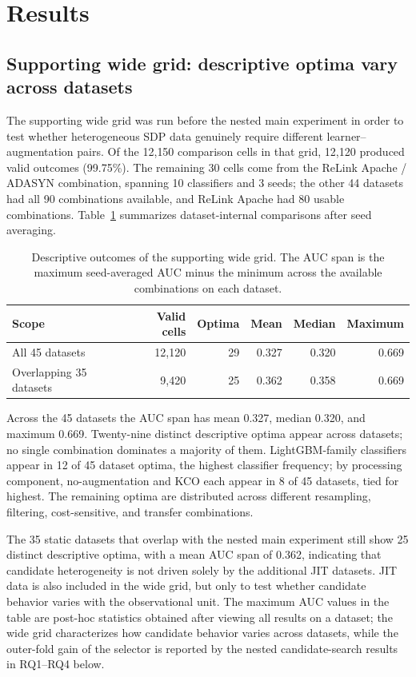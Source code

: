 \documentclass[referee]{USG}
\begin{document}
\section{Results}

\subsection{Supporting wide grid: descriptive optima vary across datasets}
The supporting wide grid was run before the nested main experiment in order to test whether heterogeneous SDP data genuinely require different learner--augmentation pairs. Of the 12{,}150 comparison cells in that grid, 12{,}120 produced valid outcomes (99.75\%). The remaining 30 cells come from the ReLink Apache / ADASYN combination, spanning 10 classifiers and 3 seeds; the other 44 datasets had all 90 combinations available, and ReLink Apache had 80 usable combinations. Table~\ref{tab:broadgrid} summarizes dataset-internal comparisons after seed averaging.

\begin{table}[t]
\caption{Descriptive outcomes of the supporting wide grid. The AUC span is the maximum seed-averaged AUC minus the minimum across the available combinations on each dataset.}
\label{tab:broadgrid}
\centering\small
\setlength{\tabcolsep}{3.5pt}
\begin{tabular}{lrrrrr}
\toprule
Scope & Valid cells & Optima & Mean & Median & Maximum\\
\midrule
All 45 datasets & 12{,}120 & 29 & 0.327 & 0.320 & 0.669\\
Overlapping 35 datasets & 9{,}420 & 25 & 0.362 & 0.358 & 0.669\\
\bottomrule
\end{tabular}
\end{table}

Across the 45 datasets the AUC span has mean 0.327, median 0.320, and maximum 0.669. Twenty-nine distinct descriptive optima appear across datasets; no single combination dominates a majority of them. LightGBM-family classifiers appear in 12 of 45 dataset optima, the highest classifier frequency; by processing component, no-augmentation and KCO each appear in 8 of 45 datasets, tied for highest. The remaining optima are distributed across different resampling, filtering, cost-sensitive, and transfer combinations.

The 35 static datasets that overlap with the nested main experiment still show 25 distinct descriptive optima, with a mean AUC span of 0.362, indicating that candidate heterogeneity is not driven solely by the additional JIT datasets. JIT data is also included in the wide grid, but only to test whether candidate behavior varies with the observational unit. The maximum AUC values in the table are post-hoc statistics obtained after viewing all results on a dataset; the wide grid characterizes how candidate behavior varies across datasets, while the outer-fold gain of the selector is reported by the nested candidate-search results in RQ1--RQ4 below.
\end{document}
